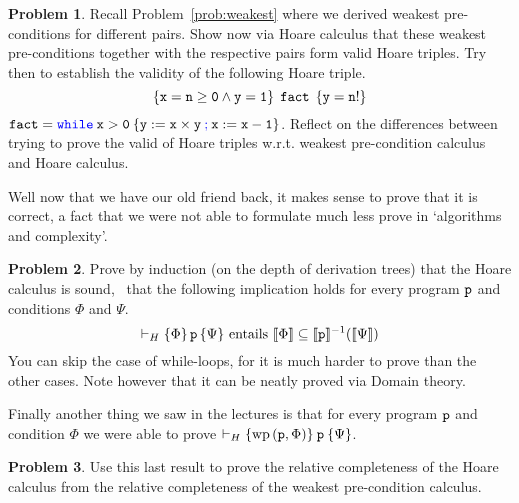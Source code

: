 \documentclass[a4paper, 11pt]{article}
\theoremstyle{definition}
\newtheorem{problem}{Problem}
\newcommand{\blue}[1]{\textcolor{blue}{#1}}
\begin{document}
\begin{problem}
        Recall Problem~\eqref{prob:weakest} where we derived weakest
        pre-conditions for different pairs. Show now via Hoare calculus that
        these weakest pre-conditions together with the respective pairs form
        valid Hoare triples.  Try then to establish the validity of the
        following Hoare triple.
        \[
                 \{ \mathtt{x = n \geq 0 \wedge y = 1} \} \> \> \mathtt{fact} \> \>
                \{ \mathtt{y = n!} \}
        \]
        ${\small \prog{fact} = \prog{\blue{while} \> x > 0 \> \{ y :=
        x \times y \> {\blue ;} \> x := x - 1 \} } }$.
        Reflect on the differences between trying to prove the valid of Hoare triples
        w.r.t. weakest pre-condition calculus and Hoare calculus.
\end{problem}

Well now that we have our old friend back, it makes sense to prove that it is
correct, a fact that we were not able to formulate much less prove in
`algorithms and complexity'.
\begin{problem}
        Prove by induction (on the depth of derivation trees) that the Hoare
        calculus is sound, \ie\ that the following implication holds for every
        program $\mathtt{p}$ and conditions $\Phi$ and $\Psi$.  \[
                \vdash_H \{ \Phi \} \, \mathtt{p} \, \{ \Psi \}
                \text{ entails }
                \llbracket \Phi \rrbracket \subseteq \llbracket \mathtt{p} \rrbracket^{-1}(\llbracket \Psi \rrbracket)
        \]
        You can skip the case of while-loops, for it is much harder to prove
        than the other cases. Note however that it can be neatly proved via
        Domain theory.
\end{problem}

Finally another thing we saw in the lectures is that for every program
$\mathtt{p}$ and condition $\Phi$ we were able to prove $\vdash_H \{ \mathrm{wp}
\, (\mathtt{p}, \Phi) \} \> \mathtt{p} \> \{ \Psi \}$.

\begin{problem}
        Use this last result to prove the relative completeness of the Hoare calculus
        from the relative completeness of the weakest pre-condition calculus.
\end{problem}
\end{document}
